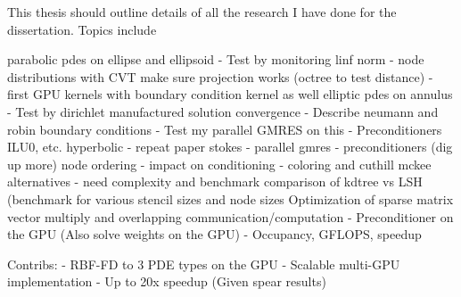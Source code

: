 This thesis should outline details of all the research I have done for the dissertation. Topics include 

parabolic pdes on ellipse and ellipsoid
    - Test by monitoring linf norm
    - node distributions with CVT make sure projection works (octree to test distance)
    - first GPU kernels with boundary condition kernel as well 
elliptic pdes on annulus
    - Test by dirichlet manufactured solution convergence
    - Describe neumann and robin boundary conditions
    - Test my parallel GMRES on this
    - Preconditioners ILU0, etc.
hyperbolic
    - repeat paper
stokes
    - parallel gmres
    - preconditioners (dig up more)
node ordering
    - impact on conditioning
    - coloring and cuthill mckee alternatives
    - need complexity and benchmark comparison of kdtree vs LSH (benchmark for
    various stencil sizes and node sizes
Optimization of sparse matrix vector multiply and overlapping communication/computation
    - Preconditioner on the GPU (Also solve weights on the GPU)
    - Occupancy, GFLOPS, speedup

Contribs: 
    - RBF-FD to 3 PDE types on the GPU
    - Scalable multi-GPU implementation
    - Up to 20x speedup (Given spear results)
